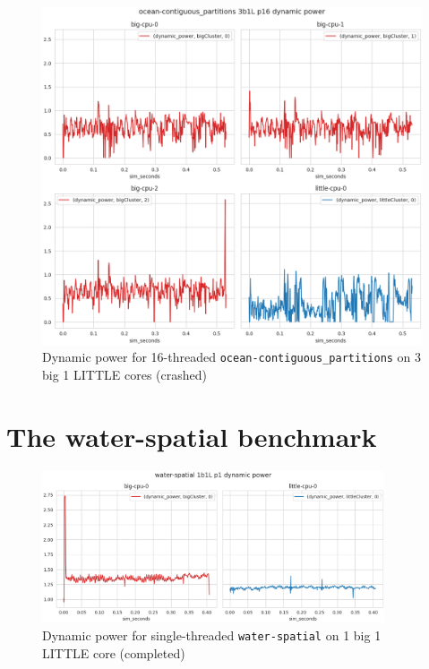 \begin{figure}[H]
    \centering
    \includegraphics[height=0.6\textheight]{roi-plots/ocean-contiguous/3b1L/p16-fail-dyn-pow.png}
    \caption{Dynamic power for 16-threaded \texttt{ocean-contiguous\_partitions}
             on 3 big 1 LITTLE cores (crashed)}
\end{figure}


\section{The water-spatial benchmark}
\begin{figure}[H]
    \centering
    \includegraphics[width=0.9\textwidth]{roi-plots/water-spatial/1b1L/p1-success-dyn-pow.png}
    \caption{Dynamic power for single-threaded \texttt{water-spatial} on 1 big
             1 LITTLE core (completed)}
\end{figure}


